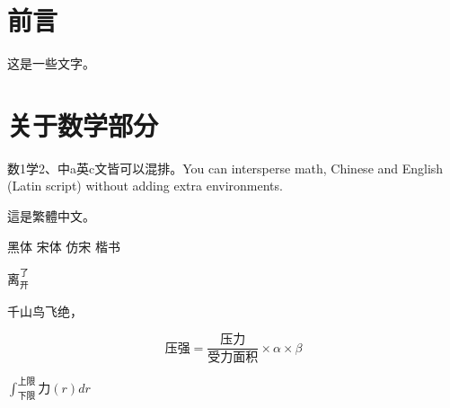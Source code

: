 \documentclass{article}
\begin{document}
\section{前言}
这是一些文字。

\section{关于数学部分}
数1学2、中a英c文皆可以混排。You can intersperse math, Chinese and English (Latin script) without adding extra environments.

這是繁體中文。

{\heiti 黑体} {\songti 宋体} {\fangsong 仿宋} {\kaishu 楷书}

$离_开^了$

千山鸟飞绝，


\[ 压强=\frac{压力}{受力面积}\times \alpha \times β \]

$ \int_{下限}^{上限} 力(r)dr $

\inputminted[linenos,frame=lines,framesep=2mm,breaklines,breaksymbolleft={},fontsize=\small]{c++}{环城2.cpp}
\end{document}

